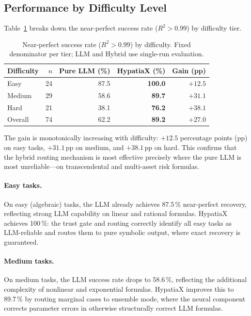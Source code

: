 \documentclass[twoside,11pt]{article}
\newcommand{\Rsq}{R^{2}}
\begin{document}
\subsection{Performance by Difficulty Level}
\label{sec:difficulty}

Table~\ref{tab:difficulty} breaks down the near-perfect success rate ($\Rsq > 0.99$)
by difficulty tier.

\begin{table}[h]
\centering
\caption{Near-perfect success rate ($\Rsq > 0.99$) by difficulty.
Fixed denominator per tier; LLM and Hybrid use single-run evaluation.}
\label{tab:difficulty}
\begin{tabular}{lrrrr}
\toprule
Difficulty & $n$ & Pure LLM (\%) & HypatiaX (\%) & Gain (pp) \\
\midrule
Easy       & 24  & 87.5          & \textbf{100.0} & $+12.5$ \\
Medium     & 29  & 58.6          & \textbf{89.7}  & $+31.1$ \\
Hard       & 21  & 38.1          & \textbf{76.2}  & $+38.1$ \\
\midrule
Overall    & 74  & 62.2          & \textbf{89.2}  & $+27.0$ \\
\bottomrule
\end{tabular}
\end{table}

The gain is monotonically increasing with difficulty: $+12.5$ percentage points (pp)
on easy tasks, $+31.1$\,pp on medium, and $+38.1$\,pp on hard.  This confirms that
the hybrid routing mechanism is most effective precisely where the pure LLM is most
unreliable---on transcendental and multi-asset risk formulas.

\paragraph{Easy tasks.}
On easy (algebraic) tasks, the LLM already achieves 87.5\,\% near-perfect recovery,
reflecting strong LLM capability on linear and rational formulas.  HypatiaX achieves
100\,\%: the trust gate and routing correctly identify all easy tasks as LLM-reliable
and routes them to pure symbolic output, where exact recovery is guaranteed.

\paragraph{Medium tasks.}
On medium tasks, the LLM success rate drops to 58.6\,\%, reflecting the additional
complexity of nonlinear and exponential formulas.  HypatiaX improves this to 89.7\,\%
by routing marginal cases to ensemble mode, where the neural component corrects
parameter errors in otherwise structurally correct LLM formulas.
\end{document}
